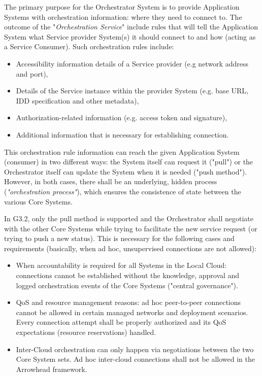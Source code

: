 \documentclass[a4paper]{arrowhead}
\begin{document}
The primary purpose for the Orchestrator System is to provide Application Systems with orchestration information: where they need to connect to. The outcome of the "\emph{Orchestration Service}" include rules that will tell the Application System what Service provider System(s) it should connect to and how (acting as a Service Consumer). Such orchestration rules include:
\begin{itemize}
	\item Accessibility information details of a Service provider (e.g network address and port),
	\item Details of the Service instance within the provider System (e.g. base URL, IDD specification and other metadata),
	\item Authorization-related information (e.g. access token and signature),
	\item Additional information that is necessary for establishing connection.
\end{itemize}

This orchestration rule information can reach the given Application System (consumer) in two different ways: the System itself can request it ("pull") or the Orchestrator itself can update the System when it is needed ("push method"). However, in both cases, there shall be an underlying, hidden process (\emph{"orchestration process"}), which ensures the consistence of state between the various Core Systems.

In G3.2, only the pull method is supported and the Orchestrator shall negotiate with the other Core Systems while trying to facilitate the new service request (or trying to push a new status). This is necessary for the following cases and requirements (basically, when ad hoc, unsupervised connections are not allowed):
\begin{itemize}
	\item When accountability is required for all Systems in the Local Cloud: connections cannot be established without the knowledge, approval and logged orchestration events of the Core Systems ("central governance"). 
	\item QoS and resource management reasons: ad hoc peer-to-peer connections cannot be allowed in certain managed networks and deployment scenarios. Every connection attempt shall be properly authorized and its QoS expectations (resource reservations) handled.  
	\item Inter-Cloud orchestration can only happen via negotiations between the two Core System sets. Ad hoc inter-cloud connections shall not be allowed in the Arrowhead framework. 
\end{itemize}
\end{document}
